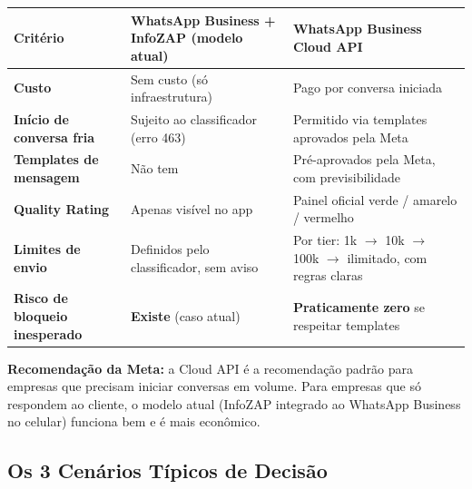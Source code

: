 \documentclass[12pt, a4paper]{article}
\begin{document}
\begin{table}[H]
    \centering
    \renewcommand{\arraystretch}{1.5}
    \begin{tabularx}{\textwidth}{X X X}
        \toprule
        \rowcolor{tableHeader} \textbf{Critério} & \textbf{WhatsApp Business + InfoZAP (modelo atual)} & \textbf{WhatsApp Business Cloud API} \\
        \midrule
        \textbf{Custo} & Sem custo (só infraestrutura) & Pago por conversa iniciada \\
        \rowcolor{lightGray}
        \textbf{Início de conversa fria} & Sujeito ao classificador (erro 463) & Permitido via templates aprovados pela Meta \\
        \textbf{Templates de mensagem} & Não tem & Pré-aprovados pela Meta, com previsibilidade \\
        \rowcolor{lightGray}
        \textbf{Quality Rating} & Apenas visível no app & Painel oficial verde / amarelo / vermelho \\
        \textbf{Limites de envio} & Definidos pelo classificador, sem aviso & Por tier: 1k $\rightarrow$ 10k $\rightarrow$ 100k $\rightarrow$ ilimitado, com regras claras \\
        \rowcolor{lightGray}
        \textbf{Risco de bloqueio inesperado} & \textcolor{accentColor}{\textbf{Existe}} (caso atual) & \textcolor{successGreen}{\textbf{Praticamente zero}} se respeitar templates \\
        \bottomrule
    \end{tabularx}
\end{table}

\textcolor{primaryColor}{\textbf{Recomendação da Meta:}} a Cloud API é a recomendação padrão para empresas que precisam iniciar conversas em volume. Para empresas que só respondem ao cliente, o modelo atual (InfoZAP integrado ao WhatsApp Business no celular) funciona bem e é mais econômico.

\needspace{12cm}

\subsection{Os 3 Cenários Típicos de Decisão}
\end{document}
